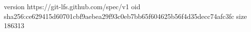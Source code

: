 version https://git-lfs.github.com/spec/v1
oid sha256:ce629415d60701cbf9aebea29f93c0eb7bb65f604625b56f4d35decc74afc3fc
size 186313

